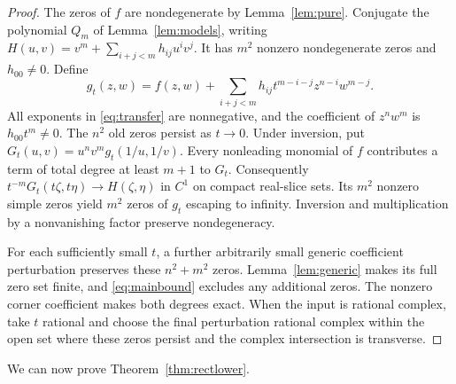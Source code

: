 \documentclass[a4paper]{amsart}
\theoremstyle{remark}
\begin{document}
\begin{proof}
The zeros of \(f\) are nondegenerate by
Lemma~\ref{lem:pure}. Conjugate the polynomial \(Q_m\)
of Lemma~\ref{lem:models}, writing
\(H(u,v)=v^m+\sum_{i+j<m}h_{ij}u^iv^j\).
It has \(m^2\) nonzero nondegenerate zeros and
\(h_{00}\ne0\). Define
\begin{equation}\label{eq:transfer}
 g_t(z,w)=f(z,w)+
 \sum_{i+j<m}h_{ij}t^{m-i-j}z^{n-i}w^{m-j}.
\end{equation}
All exponents in \eqref{eq:transfer} are nonnegative,
and the coefficient of \(z^nw^m\) is \(h_{00}t^m\ne0\).
The \(n^2\) old zeros persist as \(t\to0\).
Under inversion, put
\(G_t(u,v)=u^nv^m g_t(1/u,1/v)\).
Every nonleading monomial of \(f\) contributes a term
of total degree at least \(m+1\) to \(G_t\).
Consequently
\(t^{-m}G_t(t\zeta,t\eta)\to H(\zeta,\eta)\)
in \(C^1\) on compact real-slice sets.
Its \(m^2\) nonzero simple zeros yield \(m^2\)
zeros of \(g_t\) escaping to infinity.
Inversion and multiplication by a nonvanishing
factor preserve nondegeneracy.

For each sufficiently small \(t\), a further arbitrarily
small generic coefficient perturbation preserves
these \(n^2+m^2\) zeros.
Lemma~\ref{lem:generic} makes its full zero set finite,
and \eqref{eq:mainbound} excludes any additional zeros.
The nonzero corner coefficient makes both degrees exact.
When the input is rational complex, take \(t\) rational
and choose the final perturbation rational complex
within the open set where these zeros persist and
the complex intersection is transverse.
\end{proof}

We can now prove Theorem~\ref{thm:rectlower}.
\end{document}
